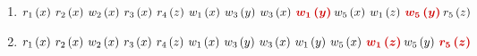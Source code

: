 \documentclass[a4paper]{article}
\begin{document}
\begin{enumerate}
		\item $r_{1}\left(x\right) \: r_{2}\left(x\right) \: w_{2}\left(x\right) \: r_{3}\left(x\right) \: r_{4}\left(z\right) \: w_{1}\left(x\right) \: w_{3}\left(y\right) \: w_{3}\left(x\right) \: \textcolor{Red3}{\boldsymbol{w_{1}\left(y\right)} \: }w_{5}\left(x\right) \: w_{1}\left(z\right) \: \textcolor{Red3}{\boldsymbol{w_{5}\left(y\right)} \: }r_{5}\left(z\right)$
		
		\item $r_{1}\left(x\right) \: r_{2}\left(x\right) \: w_{2}\left(x\right) \: r_{3}\left(x\right) \: r_{4}\left(z\right) \: w_{1}\left(x\right) \: w_{3}\left(y\right) \: w_{3}\left(x\right) \: w_{1}\left(y\right) \: w_{5}\left(x\right) \: \textcolor{Red3}{\boldsymbol{w_{1}\left(z\right)} \: }w_{5}\left(y\right) \: \textcolor{Red3}{\boldsymbol{r_{5}\left(z\right)}}$
	\end{enumerate}\newpage
\end{document}
